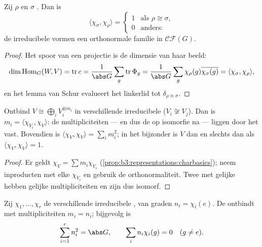 \begin{theorem}
\label{thm:b3:representations:orthogonality}
Zij $\rho$ en $\sigma$ \emph{}. Dan
is
\[
\langle\chi_\sigma, \chi_\rho\rangle =
\begin{cases}
1 & \text{als } \rho \cong \sigma,\\
0 & \text{anders:}
\end{cases}
\]
de irreducibele  vormen een orthonormale familie in
$\mathcal{CF}(G)$.
\end{theorem}

\begin{proof}
Het spoor van een projectie is de dimensie van haar beeld:
\[
\dim\operatorname{Hom}_G(W, V) = \operatorname{tr} c
= \frac1{\abs G}\sum_g \operatorname{tr}\Phi_g
= \frac1{\abs G}\sum_g \chi_\rho(g)\overline{\chi_\sigma(g)}
= \langle \chi_\sigma, \chi_\rho\rangle,
\]
en het lemma van Schur evalueert het linkerlid tot $\delta_{\rho
\cong \sigma}$.
\end{proof}

\begin{corollary}\label{cor:b3:representations:multiplicity}
Ontbind $V \cong \bigoplus_i V_i^{\oplus m_i}$ in verschillende
irreducibele ($V_i \not\cong V_j$). Dan is $m_i = \langle
\chi_{V_i}, \chi_V\rangle$: de multipliciteiten --- en dus de
 op isomorfie na --- liggen door het  vast.
Bovendien is $\langle \chi_V, \chi_V\rangle = \sum_i m_i^2$; in
het bijzonder is $V$  dan en slechts dan als
$\langle\chi_V, \chi_V\rangle = 1$.
\end{corollary}

\begin{proof}
Er geldt $\chi_V = \sum m_i\chi_{V_i}$
(\cref{prop:b3:representations:charbasics}); neem inproducten met
elke $\chi_{V_i}$ en gebruik de orthonormaliteit. Twee
 met gelijke  hebben gelijke
multipliciteiten en zijn dus isomorf.
\end{proof}

\begin{theorem}
\label{thm:b3:representations:regular}
Zij $\chi_1, \dots, \chi_r$ de verschillende irreducibele
, van graden $n_i = \chi_i(e)$. De  ontbindt met multipliciteiten $m_i = n_i$; bijgevolg
is
\[
\sum_{i=1}^{r} n_i^2 = \abs G,
\qquad
\sum_i n_i\chi_i(g) = 0 \quad (g \neq e).
\]
\end{theorem}

